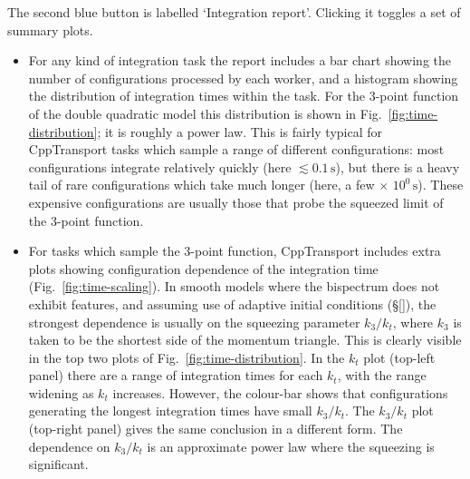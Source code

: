 \documentclass[11pt,a4paper]{article}
\newcommand{\packagefont}{\sffamily}
\newcommand{\CppTransport}{{\packagefont CppTransport}}
\newcommand{\second}{\,\mathrm{s}}
\newcommand{\semibold}[1]{{\fontseries{b}\selectfont{#1}}}
\newcommand{\para}[1]{\par\vspace{2mm}\noindent\semibold{{#1.}---}\ignorespaces}
\begin{document}
\para{Integration report}
The second blue button is labelled `Integration report'.
Clicking it toggles a set of summary plots.
\begin{itemize}
    \item For any kind of integration task the report includes a
    bar chart showing the number of configurations processed by each
    worker, and a histogram showing the distribution of integration times
    within the task.
    For the 3-point function of the double quadratic model
    this distribution is shown in Fig.~\ref{fig:time-distribution};
    it is roughly a power law.
    This is fairly typical for
    {\CppTransport} tasks which sample a range of different configurations:
    most configurations integrate relatively quickly
    (here $\lesssim 0.1 \second$),
    but there is a heavy tail of
    rare configurations
    which take much longer
    (here, a few $\times$ $10^0 \second$).
    These expensive configurations are usually those that probe the
    squeezed limit of the 3-point function.
    
    \item For tasks which sample the 3-point function, {\CppTransport}
    includes extra plots showing configuration dependence of the
    integration time
    (Fig.~\ref{fig:time-scaling}).
    In smooth models where the bispectrum does not exhibit features,
    and assuming use of adaptive initial conditions (\S\ref{}),
    the strongest dependence is usually on the squeezing parameter
    $k_3 / k_t$, where $k_3$
    is taken to be the shortest side of the momentum triangle.
    This is clearly visible in the top two plots of Fig.~\ref{fig:time-distribution}.
    In the $k_t$ plot (top-left panel)
    there are a range of integration times for each $k_t$, with the range
    widening as $k_t$ increases.
    However, the colour-bar shows that configurations generating the longest
    integration times have small $k_3/k_t$.
    The $k_3/k_t$ plot (top-right panel)
    gives the same conclusion in a different form.
    The dependence on $k_3/k_t$ is an approximate power law where the
    squeezing is significant.
\end{itemize}
\end{document}
